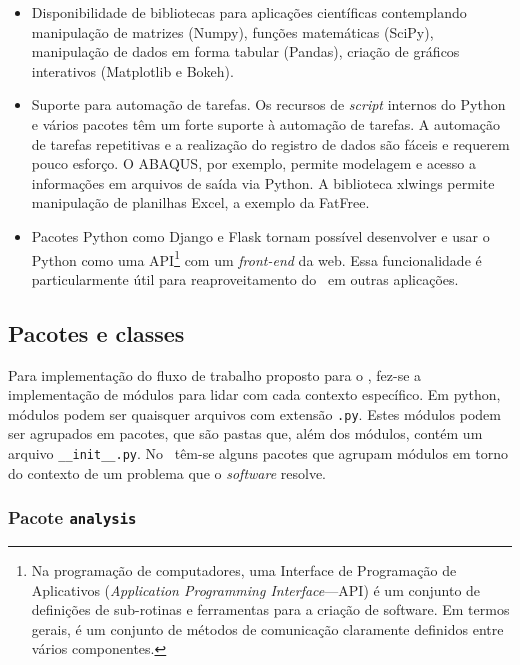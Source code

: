 \begin{itemize}
    \item Disponibilidade de bibliotecas para aplicações científicas contemplando manipulação de matrizes (Numpy), funções matemáticas (SciPy), manipulação de dados em forma tabular (Pandas), criação de gráficos interativos (Matplotlib e Bokeh).

    \item Suporte para automação de tarefas. Os recursos de \textit{script} internos do Python e vários pacotes têm um forte suporte à automação de tarefas. A automação de tarefas repetitivas e a realização do registro de dados são fáceis e requerem pouco esforço. O ABAQUS, por exemplo, permite modelagem e acesso a informações em arquivos de saída via Python. A biblioteca xlwings permite manipulação de planilhas Excel, a exemplo da FatFree.

    \item Pacotes Python como Django e Flask tornam possível desenvolver e usar o Python como uma API\footnote{Na programação de computadores, uma Interface de Programação de Aplicativos (\textit{Application Programming Interface}---API) é um conjunto de definições de sub-rotinas e ferramentas para a criação de software. Em termos gerais, é um conjunto de métodos de comunicação claramente definidos entre vários componentes.} com um \textit{front-end} da web. Essa funcionalidade é particularmente útil para reaproveitamento do \frame\  em outras aplicações.
\end{itemize}


\subsection{Pacotes e classes}


Para implementação do fluxo de trabalho proposto para o \frame, fez-se a implementação de módulos para lidar com cada contexto específico. Em python, módulos podem ser quaisquer arquivos com extensão \texttt{.py}. Estes módulos podem ser agrupados em pacotes, que são pastas que, além dos módulos, contém um arquivo \texttt{\_\_init\_\_.py}. No \frame\ têm-se alguns pacotes que agrupam módulos em torno do contexto de um problema que o \textit{software} resolve. %


\subsubsection{Pacote \texttt{analysis}}


